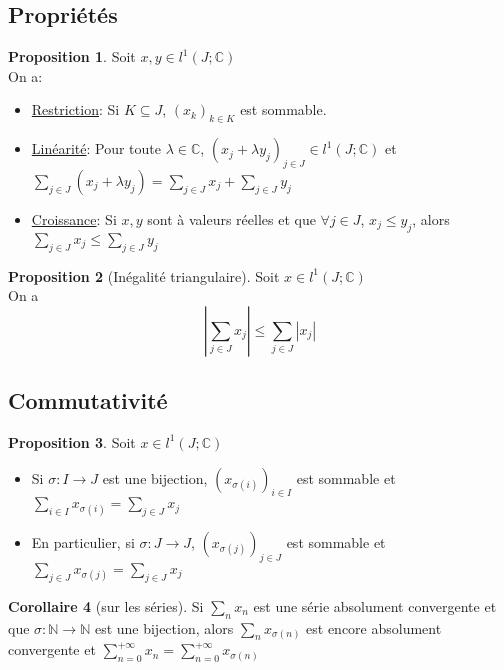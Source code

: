 \documentclass[10pt,a4paper]{article}
\theoremstyle{definition}
\newtheorem{proposition}{Proposition}[section]
\newtheorem{corollaire}[proposition]{Corollaire}
\begin{document}
\subsection{Propriétés}
\begin{proposition}
Soit $x, y \in l^1(J; \mathbb{C})$ \\
On a:
\begin{itemize}
\item \uline{Restriction}: Si $K \subseteq J$, $(x_k)_{k \in K}$ est sommable.
\item \uline{Linéarité}: Pour toute $\lambda \in \mathbb{C}$, $(x_j + \lambda y_j)_{j \in J} \in l^1(J; \mathbb{C})$ et $\sum\limits_{j \in J} (x_j + \lambda y_j) = \sum\limits_{j \in J} x_j + \sum\limits_{j \in J} y_j$
\item \uline{Croissance}: Si $x, y$ sont à valeurs réelles et que $\forall j \in J$, $x_j \leq y_j$, alors $\sum\limits_{j \in J} x_j \leq \sum\limits_{j \in J} y_j$
\end{itemize}
\end{proposition}
\begin{proposition}[Inégalité triangulaire]
Soit $x \in l^1(J; \mathbb{C})$ \\
On a
\[ \left| \sum\limits_{j \in J} x_j \right| \leq \sum\limits_{j \in J} \left| x_j \right|\]
\end{proposition}

\subsection{Commutativité}
\begin{proposition}
Soit $x \in l^1(J; \mathbb{C})$
\begin{itemize}
\item Si $\sigma: I \to J$ est une bijection, $(x_{\sigma(i)})_{i \in I}$ est sommable et $\sum\limits_{i \in I} x_{\sigma(i)} = \sum\limits_{j \in J} x_j$
\item En particulier, si $\sigma: J \to J$, $(x_{\sigma(j)})_{j \in J}$ est sommable et $\sum\limits_{j \in J} x_{\sigma(j)} = \sum\limits_{j \in J} x_j$
\end{itemize}
\end{proposition}
\begin{corollaire}[sur les séries]
Si $\sum\limits_n x_n$ est une série absolument convergente et que $\sigma: \mathbb{N} \to \mathbb{N}$ est une bijection, alors $\sum\limits_n x_{\sigma(n)}$ est encore absolument convergente et $\sum\limits_{n = 0}^{+\infty} x_n = \sum\limits_{n = 0}^{+\infty} x_{\sigma(n)}$
\end{corollaire}
\end{document}
